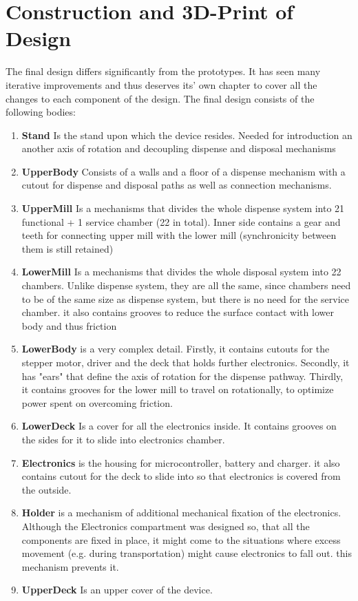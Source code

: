 \section{Construction and 3D-Print of Design}
The final design differs significantly from the prototypes. It has seen many iterative improvements and thus deserves its' own chapter to cover all the changes to each component of the design. The final design consists of the following bodies:
\begin{enumerate}
	\item{\textbf{Stand}} Is the stand upon which the device resides. Needed for introduction an another axis of rotation and decoupling dispense and disposal mechanisms
	\item{\textbf{UpperBody}} Consists of a walls and a floor of a dispense mechanism with a cutout for dispense and disposal paths as well as connection mechanisms.
	\item{\textbf{UpperMill}} Is a mechanisms that divides the whole dispense system into 21 functional + 1 service chamber (22 in total). Inner side contains a gear and teeth for connecting upper mill with the lower mill (synchronicity between them is still retained)
	\item{\textbf{LowerMill}} Is a mechanisms that divides the whole disposal system into 22 chambers. Unlike dispense system, they are all the same, since chambers need to be of the same size as dispense system, but there is no need for the service chamber. it also contains grooves to reduce the surface contact with lower body and thus friction
	\item{\textbf{LowerBody}} is a very complex detail. Firstly, it contains cutouts for the stepper motor, driver and the deck that holds further electronics. Secondly, it has "ears" that define the axis of rotation for the dispense pathway. Thirdly, it contains grooves for the lower mill to travel on rotationally, to optimize power spent on overcoming friction.
	\item{\textbf{LowerDeck}} Is a cover for all the electronics inside. It contains grooves on the sides for it to slide into electronics chamber.
	\item{\textbf{Electronics}} is the housing for microcontroller, battery and charger. it also contains cutout for the deck to slide into so that electronics is covered from the outside.
	\item{\textbf{Holder}} is a mechanism of additional mechanical fixation of the electronics. Although the Electronics compartment was designed so, that all the components are fixed in place, it might come to the situations where excess movement (e.g. during transportation) might cause electronics to fall out. this mechanism prevents it.
	\item{\textbf{UpperDeck}} Is an upper cover of the device.
\end{enumerate}

